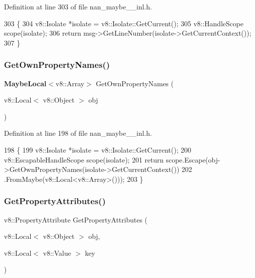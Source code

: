 Definition at line 303 of file nan\+\_\+maybe\+\_\+\_\+inl.\+h.


\begin{DoxyCode}
303                                                         \{
304   v8::Isolate *isolate = v8::Isolate::GetCurrent();
305   v8::HandleScope scope(isolate);
306   \textcolor{keywordflow}{return} msg->GetLineNumber(isolate->GetCurrentContext());
307 \}
\end{DoxyCode}
\mbox{\label{nan__maybe__43__inl_8h_a9af1215a2c52f1f55ff4096e5b79e000}} 
\subsubsection{Get\+Own\+Property\+Names()}
{\footnotesize\ttfamily \textbf{ Maybe\+Local}$<$v8\+::\+Array$>$ Get\+Own\+Property\+Names (\begin{DoxyParamCaption}\item[{v8\+::\+Local$<$ v8\+::\+Object $>$}]{obj }\end{DoxyParamCaption})}



Definition at line 198 of file nan\+\_\+maybe\+\_\+\_\+inl.\+h.


\begin{DoxyCode}
198                                                                \{
199   v8::Isolate *isolate = v8::Isolate::GetCurrent();
200   v8::EscapableHandleScope scope(isolate);
201   \textcolor{keywordflow}{return} scope.Escape(obj->GetOwnPropertyNames(isolate->GetCurrentContext())
202                           .FromMaybe(v8::Local<v8::Array>()));
203 \}
\end{DoxyCode}
\mbox{\label{nan__maybe__43__inl_8h_a7adda309d7f50cae679e1ed975069eb1}} 
\subsubsection{Get\+Property\+Attributes()}
{\footnotesize\ttfamily v8\+::\+Property\+Attribute Get\+Property\+Attributes (\begin{DoxyParamCaption}\item[{v8\+::\+Local$<$ v8\+::\+Object $>$}]{obj,  }\item[{v8\+::\+Local$<$ v8\+::\+Value $>$}]{key }\end{DoxyParamCaption})}



